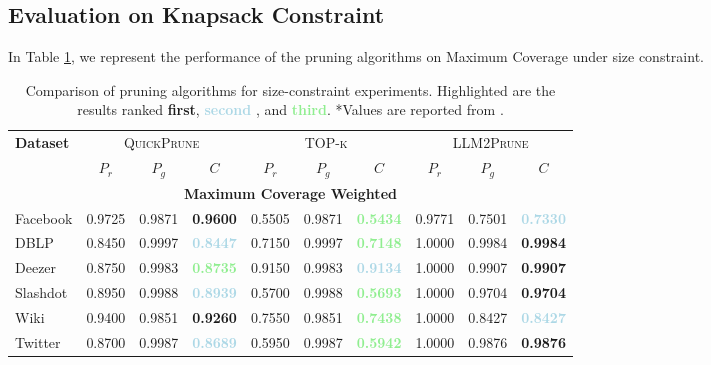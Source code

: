 \subsection{Evaluation on Knapsack Constraint}
In Table \ref{tab:multi_problem_knapsack}, we represent the performance of the pruning algorithms on Maximum Coverage under size constraint.
\begin{table}[h]
\centering
\caption{Comparison of pruning algorithms for size-constraint experiments. Highlighted are the results ranked \textbf{\textcolor{lightred}{first}}, \textbf{\textcolor{lightblue}{second}} , and \textbf{\textcolor{lightgreen}{third}}. *Values are reported from \cite{pmlr-v258-nath25a}.}
\vspace{1em}
\label{tab:multi_problem_knapsack}

\begin{tabular}{l|ccc|ccc|ccc}
\toprule
\textbf{Dataset} & \multicolumn{3}{c|}{\textsc{QuickPrune}} & \multicolumn{3}{c|}{\textsc{TOP-k}} & \multicolumn{3}{c}{\textsc{LLM2Prune}} \\
 & \textbf{$P_r$} & \textbf{$P_g$} & \textbf{$C$} & \textbf{$P_r$} & \textbf{$P_g$} & \textbf{$C$} & \textbf{$P_r$} & \textbf{$P_g$} & \textbf{$C$} \\
\midrule
\multicolumn{10}{c}{\textbf{Maximum Coverage Weighted}} \\
 \midrule
Facebook & 0.9725 & 0.9871 & \textbf{\textcolor{lightred}{0.9600}} & 0.5505 & 0.9871 & \textbf{\textcolor{lightgreen}{0.5434}} & 0.9771 & 0.7501 & \textbf{\textcolor{lightblue}{0.7330}} \\
DBLP & 0.8450 & 0.9997 & \textbf{\textcolor{lightblue}{0.8447}} & 0.7150 & 0.9997 & \textbf{\textcolor{lightgreen}{0.7148}} & 1.0000 & 0.9984 & \textbf{\textcolor{lightred}{0.9984}} \\
Deezer & 0.8750 & 0.9983 & \textbf{\textcolor{lightgreen}{0.8735}} & 0.9150 & 0.9983 & \textbf{\textcolor{lightblue}{0.9134}} & 1.0000 & 0.9907 & \textbf{\textcolor{lightred}{0.9907}} \\
Slashdot & 0.8950 & 0.9988 & \textbf{\textcolor{lightblue}{0.8939}} & 0.5700 & 0.9988 & \textbf{\textcolor{lightgreen}{0.5693}} & 1.0000 & 0.9704 & \textbf{\textcolor{lightred}{0.9704}} \\
Wiki & 0.9400 & 0.9851 & \textbf{\textcolor{lightred}{0.9260}} & 0.7550 & 0.9851 & \textbf{\textcolor{lightgreen}{0.7438}} & 1.0000 & 0.8427 & \textbf{\textcolor{lightblue}{0.8427}} \\
Twitter & 0.8700 & 0.9987 & \textbf{\textcolor{lightblue}{0.8689}} & 0.5950 & 0.9987 & \textbf{\textcolor{lightgreen}{0.5942}} & 1.0000 & 0.9876 & \textbf{\textcolor{lightred}{0.9876}} \\

\end{tabular}
\end{table}
